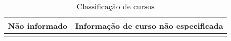 \begin{longtable}[c]{ll}
    Não informado                                                                   & Informação de curso não especificada                                                                                                                                                                                                                                                                                                                                                                                                                                                                                                                                                                                                                                                                                                                                                                                                                                                                                                                                                                                                                                                                                                                                                                                                                                                                                                                                                                                                                                                                                                                                                                                                                                                                                                                                                                    \\ \hline
    \caption{Classificação de cursos}
    \label{tab:classificacao-cursos-apendice}\\
    \end{longtable}